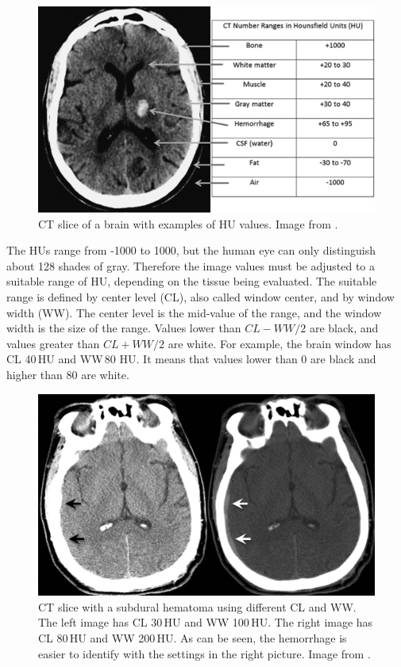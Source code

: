 \documentclass[thesis=B,english]{FITthesis}[2019/12/23]
\begin{document}
\begin{figure}[ht]
		\includegraphics[scale=1.1]{images/HU-brain}
		\centering
		\caption{CT slice of a brain with examples of HU values. Image from \cite{KAMALIAN20163}.}
\end{figure}
 
The HUs range from -1000 to 1000, but the human eye can only distinguish about 128 shades of gray. Therefore the image values must be adjusted to a suitable range of HU, depending on the tissue being evaluated. The suitable range is defined by center level (CL), also called window center, and by window width (WW). The center level is the mid-value of the range, and the window width is the size of the range. Values lower than $CL - WW/2$ are black, and values greater than $CL + WW/2$ are white.\cite{KAMALIAN20163} For example, the brain window has CL 40\,HU and WW\,80 HU.\cite{murphy_windowing} It means that values lower than 0 are black and higher than 80 are white.

\begin{figure}[ht]
		\includegraphics[scale=1.5]{images/HU-windowing}
		\centering
		\caption{CT slice with a subdural hematoma using different CL and WW. The left image has CL 30\,HU and WW 100\,HU. The right image has CL 80\,HU and WW 200\,HU. As can be seen, the hemorrhage is easier to identify with the settings in the right picture. Image from \cite{KAMALIAN20163}.}
\end{figure}
\end{document}
